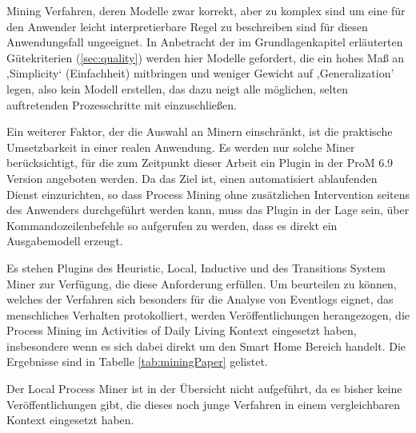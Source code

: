 Mining Verfahren, deren Modelle zwar korrekt, aber zu komplex sind um eine für den Anwender leicht interpretierbare Regel zu beschreiben sind für diesen Anwendungsfall ungeeignet. In Anbetracht der im Grundlagenkapitel erläuterten Gütekriterien (\ref{sec:quality}) werden hier Modelle gefordert, die ein hohes Maß an ‚Simplicity‘ (Einfachheit) mitbringen und weniger Gewicht auf ,Generalization' legen, also kein Modell erstellen, das dazu neigt alle möglichen, selten auftretenden Prozesschritte mit einzuschließen. 

Ein weiterer Faktor, der die Auswahl an Minern einschränkt, ist die praktische Umsetzbarkeit in einer realen Anwendung. Es werden nur solche Miner berücksichtigt, für die zum Zeitpunkt dieser Arbeit ein Plugin in der ProM 6.9 Version angeboten werden. Da das Ziel ist, einen automatisiert ablaufenden Dienst einzurichten, so dass Process Mining ohne zusätzlichen Intervention seitens des Anwenders durchgeführt werden kann, muss das Plugin in der Lage sein, über Kommandozeilenbefehle so aufgerufen zu werden, dass es direkt ein Ausgabemodell erzeugt. 

Es stehen Plugins des Heuristic, Local, Inductive und des Transitions System Miner zur Verfügung, die diese Anforderung erfüllen. Um beurteilen zu können, welches der Verfahren sich besonders für die Analyse von Eventlogs eignet, das menschliches Verhalten protokolliert, werden Veröffentlichungen herangezogen, die Process Mining im Activities of Daily Living Kontext eingesetzt haben, insbesondere wenn es sich dabei direkt um den Smart Home Bereich handelt. Die Ergebnisse sind in Tabelle \ref{tab:miningPaper} gelistet. 

Der Local Process Miner ist in der Übersicht nicht aufgeführt, da es bisher keine Veröffentlichungen gibt, die dieses noch junge Verfahren in einem vergleichbaren Kontext eingesetzt haben. 

